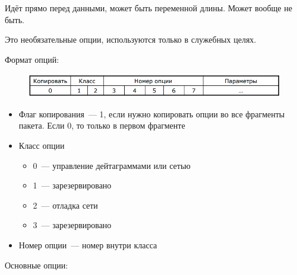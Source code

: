 
Идёт прямо перед данными, может быть переменной длины. Может вообще не быть.

Это необязательные опции, используются только в служебных целях.

Формат опций:

\begin{figure}[H]
  \centering
  \includegraphics[width=15cm]{images/02/04}
\end{figure}

\begin{itemize}
    \item Флаг копирования~--- 1, если нужно копировать опции во все фрагменты пакета. Если 0, то только в первом фрагменте
    \item Класс опции
    \begin{itemize}
        \item 0~--- управление дейтаграммами или сетью
        \item 1~--- зарезервировано
        \item 2~--- отладка сети
        \item 3~--- зарезервировано
    \end{itemize}
    \item Номер опции~--- номер внутри класса
\end{itemize}

Основные опции:

